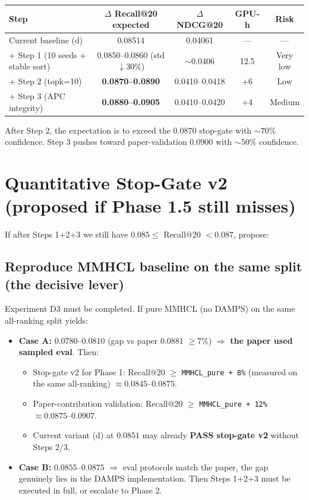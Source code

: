 \documentclass[11pt,a4paper]{article}
\begin{document}
\renewcommand{\arraystretch}{1.3}
\begin{table}[H]
\centering
\begin{tabular}{|p{4.8cm}|c|c|c|c|}
\hline
\textbf{Step} & \textbf{$\Delta$ Recall@20 expected} & \textbf{$\Delta$ NDCG@20} & \textbf{GPU-h} & \textbf{Risk} \\ \hline
Current baseline (d)                    & 0.08514                       & 0.04061         & ---  & ---       \\ \hline
+ Step 1 (10 seeds + stable sort)       & 0.0850--0.0860 (std $\downarrow 30\%$) & $\sim 0.0406$    & 12.5 & Very low  \\ \hline
+ Step 2 (topk=10)                      & \textbf{0.0870--0.0890}       & 0.0410--0.0418  & +6   & Low       \\ \hline
+ Step 3 (APC integrity)                & \textbf{0.0880--0.0905}       & 0.0410--0.0420  & +4   & Medium    \\ \hline
\end{tabular}
\end{table}

After Step 2, the expectation is to exceed the $0.0870$ stop-gate with
$\sim 70\%$ confidence. Step 3 pushes toward paper-validation $0.0900$ with
$\sim 50\%$ confidence.

\section{Quantitative Stop-Gate v2 (proposed if Phase 1.5 still misses)}

If after Steps 1+2+3 we still have $0.085 \leq$ Recall@20 $< 0.087$, propose:

\subsection*{Reproduce MMHCL baseline on the same split (the decisive lever)}

Experiment D3 must be completed. If pure MMHCL (no DAMPS) on the same
all-ranking split yields:

\begin{itemize}[leftmargin=*]
    \item \textbf{Case A:} $0.0780$--$0.0810$ (gap vs paper $0.0881$ $\geq 7\%$) $\Rightarrow$ \textbf{the paper used sampled eval}. Then:
    \begin{itemize}
        \item Stop-gate v2 for Phase 1: Recall@20 $\geq$ \texttt{MMHCL\_pure + 8\%} (measured on the same all-ranking) $\approx \mathbf{0.0845\text{--}0.0875}$.
        \item Paper-contribution validation: Recall@20 $\geq$ \texttt{MMHCL\_pure + 12\%} $\approx \mathbf{0.0875\text{--}0.0907}$.
        \item Current variant (d) at $0.0851$ may already \textbf{PASS stop-gate v2} without Steps 2/3.
    \end{itemize}
    \item \textbf{Case B:} $0.0855$--$0.0875$ $\Rightarrow$ eval protocols match the paper, the gap genuinely lies in the DAMPS implementation. Then Steps 1+2+3 must be executed in full, or escalate to Phase 2.
\end{itemize}
\end{document}
